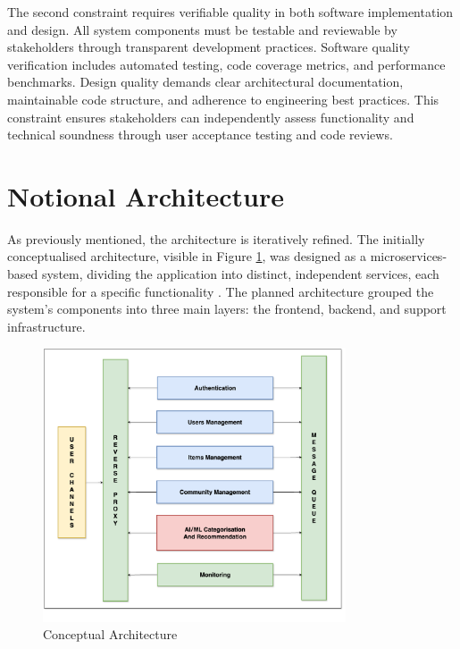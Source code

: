 The second constraint requires verifiable quality in both software implementation and design. All system components must be testable and reviewable by stakeholders through transparent development practices. Software quality verification includes automated testing, code coverage metrics, and performance benchmarks. Design quality demands clear architectural documentation, maintainable code structure, and adherence to engineering best practices. This constraint ensures stakeholders can independently assess functionality and technical soundness through user acceptance testing and code reviews.


\section{Notional Architecture} \label{section:notional_architecture}

As previously mentioned, the architecture is iteratively refined. The initially conceptualised architecture, visible in Figure \ref{fig:conceptual_arch}, was designed as a microservices-based system, dividing the application into distinct, independent services, each responsible for a specific functionality \cite{Al-Debagy2021,Söylemez2024}. The planned architecture grouped the system's components into three main layers: the frontend, backend, and support infrastructure.

\begin{figure}[!htb]
    \includegraphics[width=0.8\textwidth]{figs/chapter3/conceptual_arch.png}
    \centering
    \caption{Conceptual Architecture}
    \label{fig:conceptual_arch}
\end{figure}

